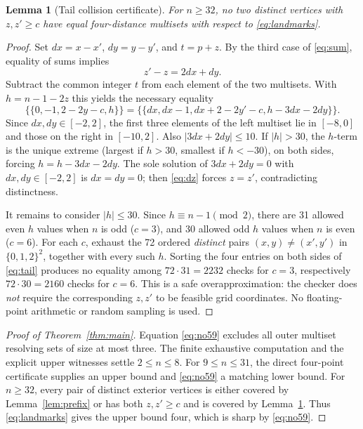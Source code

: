 \documentclass[10pt,a4paper]{article}
\newtheorem{lemma}{Lemma}
\begin{document}
\begin{lemma}[Tail collision certificate]\label{lem:tail}
For $n\ge32$, no two distinct vertices with $z,z'\ge c$ have equal
four-distance multisets with respect to \eqref{eq:landmarks}.
\end{lemma}
\begin{proof}
Set $dx=x-x'$, $dy=y-y'$, and $t=p+z$.
By the third case of \eqref{eq:sum}, equality of sums implies
\begin{equation}\label{eq:dz}
 z'-z=2dx+dy.
\end{equation}
Subtract the common integer $t$ from each element of the two multisets.
With $h=n-1-2z$ this yields the necessary equality
\begin{equation}\label{eq:tail}
 \{\!\{0,-1,2-2y-c,h\}\!\}
 =\{\!\{dx,dx-1,dx+2-2y'-c,h-3dx-2dy\}\!\}.
\end{equation}
Since $dx,dy\in[-2,2]$, the first three elements of the left
multiset lie in $[-8,0]$ and those on the right in $[-10,2]$.
Also $|3dx+2dy|\le10$.
If $|h|>30$, the $h$-term is the unique extreme (largest if $h>30$,
smallest if $h<-30$), on both sides, forcing
$h=h-3dx-2dy$. The sole solution of $3dx+2dy=0$
with $dx,dy\in[-2,2]$ is $dx=dy=0$; then \eqref{eq:dz}
forces $z=z'$, contradicting distinctness.

It remains to consider $|h|\le30$. Since $h\equiv n-1\pmod2$,
there are 31 allowed even $h$ values when $n$ is odd ($c=3$), and
30 allowed odd $h$ values when $n$ is even ($c=6$).
For each $c$, exhaust the 72 ordered \emph{distinct} pairs
$(x,y)\ne(x',y')$ in $\{0,1,2\}^2$, together with every such $h$.
Sorting the four entries on both sides of \eqref{eq:tail}
produces no equality among $72\cdot31=2232$ checks for $c=3$,
respectively $72\cdot30=2160$ checks for $c=6$.
This is a safe overapproximation: the checker does \emph{not}
require the corresponding $z,z'$ to be feasible grid coordinates.
No floating-point arithmetic or random sampling is used.
\end{proof}

\begin{proof}[Proof of Theorem~\ref{thm:main}]
Equation \eqref{eq:no59} excludes all outer multiset resolving sets of size
at most three. The finite exhaustive computation and the explicit
upper witnesses settle $2\le n\le8$. For $9\le n\le31$, the direct
four-point certificate supplies an upper bound and \eqref{eq:no59} a
matching lower bound. For $n\ge32$, every pair of distinct exterior
vertices is either covered by Lemma~\ref{lem:prefix} or has both
$z,z'\ge c$ and is covered by Lemma~\ref{lem:tail}.
Thus \eqref{eq:landmarks} gives the upper bound four, which is sharp
by \eqref{eq:no59}.
\end{proof}
\end{document}
